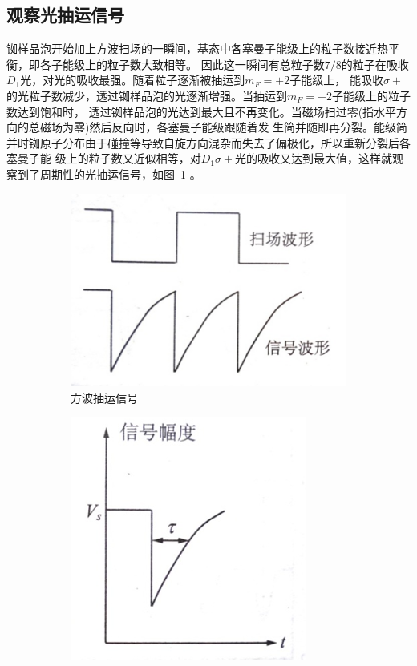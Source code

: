 \documentclass[11pt,a4paper]{article}
\begin{document}
\begin{spacing}{1.3}
\begin{CJK*}{UTF8}{gbsn}
\subsection{观察光抽运信号}
铷样品泡开始加上方波扫场的一瞬间，基态中各塞曼子能级上的粒子数接近热平衡，即各子能级上的粒子数大致相等。
因此这一瞬间有总粒子数$7/8$的粒子在吸收$D_1$光，对光的吸收最强。随着粒子逐渐被抽运到$m_F=+2$子能级上，
能吸收$\sigma +$的光粒子数减少，透过铷样品泡的光逐渐增强。当抽运到$m_F=+2$子能级上的粒子数达到饱和时，
透过铷样品泡的光达到最大且不再变化。当磁场扫过零(指水平方向的总磁场为零)然后反向时，各塞曼子能级跟随着发
生简并随即再分裂。能级简并时铷原子分布由于碰撞等导致自旋方向混杂而失去了偏极化，所以重新分裂后各塞曼子能
级上的粒子数又近似相等，对$D_1 \sigma +$光的吸收又达到最大值，这样就观察到了周期性的光抽运信号，如图~\ref{fig:fanga} 。
\begin{figure}[h!]
\begin{subfigure}{0.50\textwidth}
\includegraphics[width=\linewidth]{fang} 
\caption{方波抽运信号}
\label{fig:fanga}
\end{subfigure}
\begin{subfigure}{0.50\textwidth}
\centering
\includegraphics[width=0.66\linewidth]{tau}

\end{subfigure}
\end{figure}
\end{CJK*}
\end{spacing}
\end{document}
